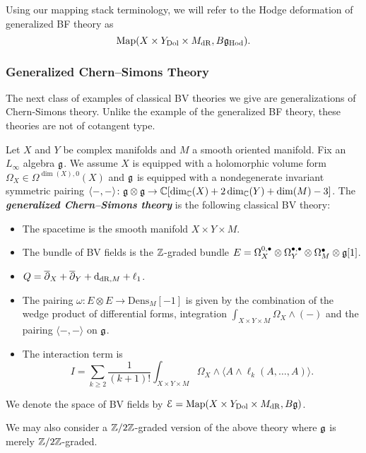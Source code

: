 \documentclass[10pt, oneside]{article}
\newcommand{\Dens}{\mathrm{Dens}}
\newcommand{\defterm}[1]{\textbf{\emph{#1}}}
\begin{document}
Using our mapping stack terminology, we will refer to the Hodge deformation of generalized BF theory as
\[\mathrm{Map}(X \times Y_{\mathrm{Dol}} \times M_{\mathrm{dR}}, B\mathfrak{g}_{\mathrm{Hod}}).\]

\subsubsection{Generalized Chern--Simons Theory} \label{gen_CS_section}
The next class of examples of classical BV theories we give are generalizations of Chern-Simons theory. Unlike the example of the generalized BF theory, these theories are not of cotangent type.

\begin{definition}
Let $X$ and $Y$ be complex manifolds and $M$ a smooth oriented manifold. Fix an $L_\infty$ algebra $\mathfrak g$. We assume $X$ is equipped with a holomorphic volume form $\Omega_X \in\Omega^{\dim(X), 0}(X)$ and $\mathfrak g$ is equipped with a nondegenerate invariant symmetric pairing $\langle-, -\rangle\colon \mathfrak g\otimes\mathfrak g\rightarrow \mathbb C[\dim_\mathbb C(X) + 2\dim_\mathbb C(Y) + \dim(M) - 3]$. The \defterm{generalized Chern--Simons theory} is the following classical BV theory:
\begin{itemize}
\item The spacetime is the smooth manifold $X\times Y\times M$.

\item The bundle of BV fields is the $\mathbb Z$-graded bundle $E = \Omega^{0,\bullet}_X \otimes \Omega^{\bullet,\bullet}_Y \otimes \Omega^\bullet_M \otimes \mathfrak g[1]$.

\item $Q = \overline{\partial}_X + \overline{\partial}_Y + {\rm d}_{\mathrm{dR}, M} + \ell_1$.

\item The pairing $\omega\colon E\otimes E\rightarrow \Dens_M[-1]$ is given by the combination of the wedge product of differential forms, integration $\int_{X\times Y\times M} \Omega_X\wedge (-)$ and the pairing $\langle -, -\rangle$ on $\mathfrak g$.

\item The interaction term is
\[I = \sum_{k\geq 2}\frac{1}{(k+1)!} \int_{X\times Y\times M} \Omega_X\wedge \langle A\wedge \ell_k(A, \dots, A)\rangle.\]
\end{itemize}
We denote the space of BV fields by $\mathcal E = \operatorname{Map}(X\times Y_{\mathrm{Dol}}\times M_{\mathrm{dR}}, B \mathfrak g)$.
\label{def:generalizedCS}
\end{definition}

We may also consider a $\mathbb Z/2\mathbb Z$-graded version of the above theory where $\mathfrak g$ is merely $\mathbb Z/2\mathbb Z$-graded.
\end{document}
